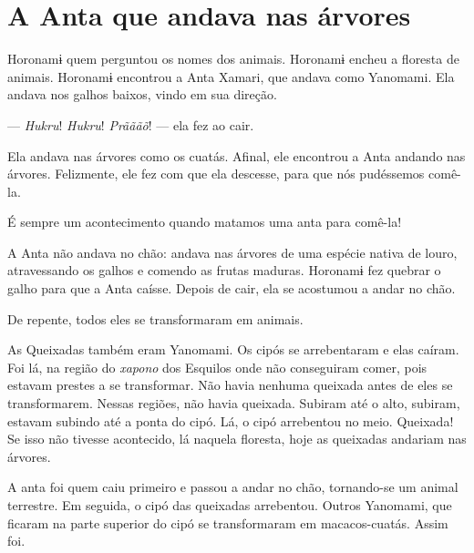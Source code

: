  \chapter{A Anta que andava nas árvores}
 
 Horonamɨ quem perguntou os nomes dos animais. Horonamɨ encheu a
floresta de animais. 
Horonamɨ encontrou a Anta Xamari, que andava como Yanomami. Ela andava
nos galhos baixos, vindo em sua direção. 

--- \textit{Hukru}! \textit{Hukru}! \textit{Prãããõ}! --- ela fez ao cair. 

Ela andava nas árvores como os cuatás. Afinal, ele encontrou a Anta
andando nas árvores. Felizmente, ele fez com que ela descesse, para que
nós pudéssemos comê-la. 

É sempre um acontecimento quando matamos uma anta para comê-la! 

A Anta não andava no chão: andava nas árvores de uma espécie nativa de
louro, atravessando os galhos e comendo as frutas maduras. Horonamɨ fez
quebrar o galho para que a Anta caísse. Depois de cair, ela se acostumou
a andar no chão. 



De repente, todos eles se transformaram em animais. 

As Queixadas também eram Yanomami. Os cipós se
arrebentaram e elas caíram. Foi lá, na região do \textit{xapono} dos Esquilos
onde não conseguiram comer, pois estavam prestes a se transformar. Não
havia nenhuma queixada antes de eles se transformarem. Nessas regiões,
não havia queixada. Subiram até o alto, subiram, estavam subindo até a
ponta do cipó. Lá, o cipó arrebentou no meio. Queixada! Se isso não
tivesse acontecido, lá naquela floresta, hoje as queixadas andariam nas
árvores. 

A anta foi quem caiu primeiro e passou a andar no chão, tornando-se um
animal terrestre. Em seguida, o cipó das queixadas arrebentou. Outros
Yanomami, que ficaram na parte superior do cipó se transformaram em
macacos-cuatás. Assim foi.

